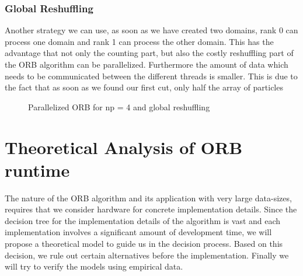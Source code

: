 \documentclass[]{article}
\begin{document}
\subsubsection{Global Reshuffling}

Another strategy we can use, as soon as we have created two domains, rank 0 can process one domain and rank 1 can process the other domain. This has the advantage that not only the counting part, but also the costly reshuffling part of the ORB algorithm can be parallelized. Furthermore the amount of data which needs to be communicated between the different threads is smaller. This is due to the fact that as soon as we found our first cut, only half the array of particles 


\begin{figure}[H]
	\begin{center}
	\end{center}
	\caption{Parallelized ORB for np = 4 and global reshuffling}
	\label{fig:orb_parallel}
\end{figure}

\vspace{5mm}

\newpage
\section{Theoretical Analysis of ORB runtime}

The nature of the ORB algorithm and its application with very large data-sizes, requires that we consider hardware for concrete implementation details. Since the decision tree for the implementation details of the algorithm is vast and each implementation involves a significant amount of development time, we will propose a theoretical model to guide us in the decision process. Based on this decision, we rule out certain alternatives before the implementation. Finally we will try to verify the models using empirical data.
\end{document}
